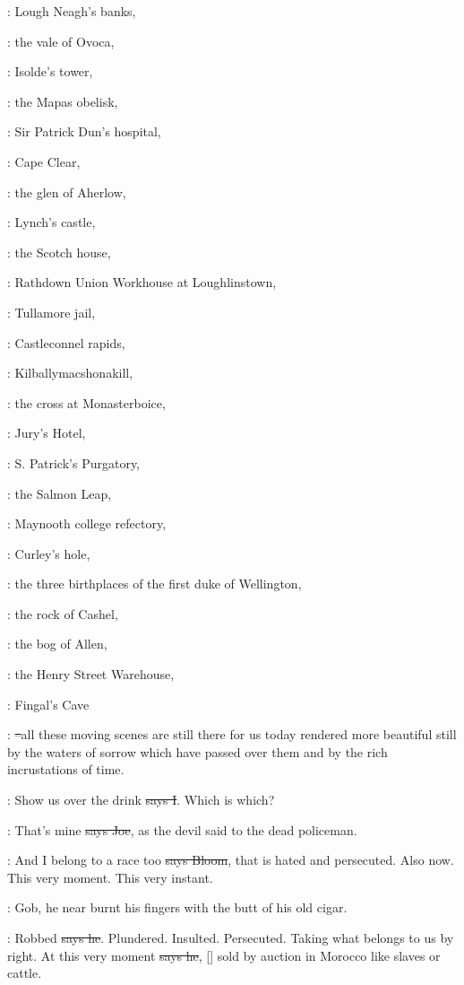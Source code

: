 :
Lough Neagh's banks,

:
the vale of Ovoca,

:
Isolde's tower,

:
the Mapas obelisk, 

:
Sir Patrick Dun's hospital, 

:
Cape Clear, 

:
the glen of Aherlow, 

:
Lynch's castle, 

:
the Scotch house, 

:
Rathdown Union Workhouse at Loughlinstown, 

:
Tullamore jail, 

:
Castleconnel rapids, 

:
Kilballymacshonakill, 

:
the cross at Monasterboice, 

:
Jury's Hotel, 

:
S. Patrick's Purgatory, 

:
the Salmon Leap, 

:
Maynooth college refectory, 

:
Curley's hole, 

:
the three birthplaces of the first duke of Wellington, 

:
the rock of Cashel, 

:
the bog of Allen, 

:
the Henry Street Warehouse, 

:
Fingal's Cave

:
\sout{--}all these moving scenes are still there for us
today rendered more beautiful still by the waters of sorrow which have
passed over them and by the rich incrustations of time.

:
Show us over the drink \sout{says I}.
Which is which?

\joe:
That's mine \sout{says Joe},
as the devil said to the dead policeman.

\Bloom:
And I belong to a race too \sout{says Bloom},
that is hated and persecuted.
Also now. This very moment. This very instant.

\Nq:
Gob, he near burnt his fingers with the butt of his old cigar.

\Bloom:
Robbed \sout{says he}. Plundered. Insulted.
Persecuted. Taking what belongs
to us by right. At this very moment \sout{says he},
[]
sold by auction in Morocco like slaves or cattle.

